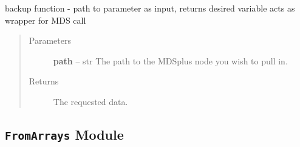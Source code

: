 \documentclass[letterpaper,10pt,english]{sphinxmanual}
\begin{document}
\begin{fulllineitems}
\begin{fulllineitems}
\label{eqtools:eqtools.EFIT.EFITTree.getParam}
backup function - path to parameter as input, returns desired variable acts as wrapper for MDS call
\begin{quote}\begin{description}
\item[{Parameters }] \leavevmode
\textbf{path} --
str
The path to the MDSplus node you wish to pull in.

\item[{Returns}] \leavevmode
The requested data.

\end{description}\end{quote}

\end{fulllineitems}


\end{fulllineitems}



\subsection{\texttt{FromArrays} Module}
\label{eqtools:module-eqtools.FromArrays}\label{eqtools:fromarrays-module}
\end{document}
